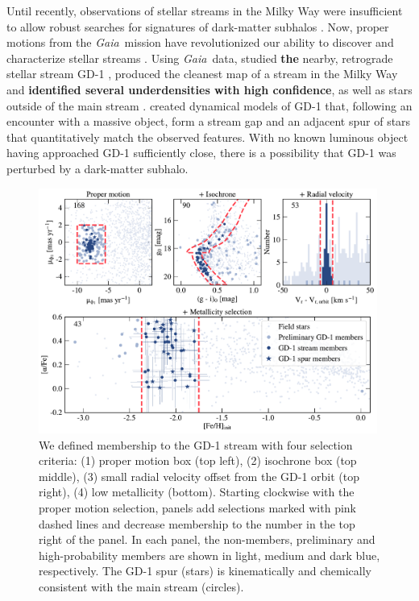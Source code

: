 \documentclass[twocolumn]{aastex63}
\newcommand{\gaia}{\textsl{Gaia}}
\newcommand{\changes}[1]{{\textbf{#1}}}
\begin{document}
Until recently, observations of stellar streams in the Milky Way were insufficient to allow robust searches for signatures of dark-matter subhalos \citep[cf.][]{carlberg2012, ibata2016}.
Now, proper motions from the \gaia\ mission \citep{gdr2} have revolutionized our ability to discover \citep[e.g.,][]{malhan2018,meingast2019} and characterize stellar streams \citep[e.g.,][]{bonaca2019b,shipp2019}.
Using \gaia\ data, \citet{pwb} studied \changes{the} nearby, retrograde stellar stream GD-1 \citep{grillmair2006}, produced the cleanest map of a stream in the Milky Way and \changes{identified several underdensities with high confidence}, as well as stars outside of the main stream \citep[see also][]{malhan2019b, deboer2019}.
\citet{bonaca2019a} created dynamical models of GD-1 that, following an encounter with a massive object, form a stream gap and an adjacent spur of stars that  quantitatively match the observed features.
With no known luminous object having approached GD-1 sufficiently close, there is a possibility that GD-1 was perturbed by a dark-matter subhalo.

\begin{figure}
\begin{center}
\includegraphics[width=0.99\textwidth]{members.pdf}
\end{center}
\caption{We defined membership to the GD-1 stream with four selection criteria: (1) proper motion box (top left), (2) isochrone box (top middle), (3) small radial velocity offset from the GD-1 orbit (top right), (4) low metallicity (bottom).
Starting clockwise with the proper motion selection, panels add selections marked with pink dashed lines and decrease membership to the number in the top right of the panel.
In each panel, the non-members, preliminary and high-probability members are shown in light, medium and dark blue, respectively.
The GD-1 spur (stars) is kinematically and chemically consistent with the main stream (circles).
}
\label{fig:members}
\end{figure}
\end{document}
